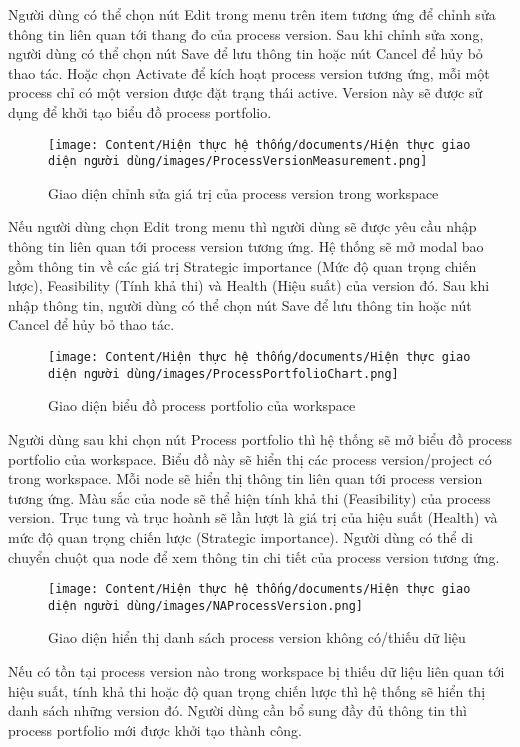 Người dùng có thể chọn nút Edit trong menu trên item tương ứng để chỉnh sửa thông tin liên quan tới thang đo của process version. Sau khi chỉnh sửa xong, người dùng có thể chọn nút Save để lưu thông tin hoặc nút Cancel để hủy bỏ thao tác. Hoặc chọn Activate để kích hoạt process version tương ứng, mỗi một process chỉ có một version được đặt trạng thái active. Version này sẽ được sử dụng để khởi tạo biểu đồ process portfolio.

\begin{figure}[H]
    \centering
    \texttt{[image: Content/Hiện thực hệ thống/documents/Hiện thực giao diện người dùng/images/ProcessVersionMeasurement.png]}
    \vspace{0.5cm}
    \caption{Giao diện chỉnh sửa giá trị của process version trong workspace}
    \label{fig: Giao diện chỉnh sửa giá trị của process version trong workspace}
\end{figure}

Nếu người dùng chọn Edit trong menu thì người dùng sẽ được yêu cầu nhập thông tin liên quan tới process version tương ứng. Hệ thống sẽ mở modal bao gồm thông tin về các giá trị Strategic importance (Mức độ quan trọng chiến lược), Feasibility (Tính khả thi) và Health (Hiệu suất) của version đó. Sau khi nhập thông tin, người dùng có thể chọn nút Save để lưu thông tin hoặc nút Cancel để hủy bỏ thao tác.

\begin{figure}[H]
    \centering
    \texttt{[image: Content/Hiện thực hệ thống/documents/Hiện thực giao diện người dùng/images/ProcessPortfolioChart.png]}
    \vspace{0.5cm}
    \caption{Giao diện biểu đồ process portfolio của workspace}
    \label{fig: Giao diện biểu đồ process portfolio của workspace}
\end{figure}

Người dùng sau khi chọn nút Process portfolio thì hệ thống sẽ mở biểu đồ process portfolio của workspace. Biểu đồ này sẽ hiển thị các process version/project có trong workspace. Mỗi node sẽ hiển thị thông tin liên quan tới process version tương ứng. Màu sắc của node sẽ thể hiện tính khả thi (Feasibility) của process version. Trục tung và trục hoành sẽ lần lượt là giá trị của hiệu suất (Health) và mức độ quan trọng chiến lược (Strategic importance). Người dùng có thể di chuyển chuột qua node để xem thông tin chi tiết của process version tương ứng.

\begin{figure}[H]
    \centering
    \texttt{[image: Content/Hiện thực hệ thống/documents/Hiện thực giao diện người dùng/images/NAProcessVersion.png]}
    \vspace{0.5cm}
    \caption{Giao diện hiển thị danh sách process version không có/thiếu dữ liệu}
    \label{fig: Giao diện hiển thị danh sách process version không có/thiếu dữ liệu}
\end{figure}

Nếu có tồn tại process version nào trong workspace bị thiếu dữ liệu liên quan tới hiệu suất, tính khả thi hoặc độ quan trọng chiến lược thì hệ thống sẽ hiển thị danh sách những version đó. Người dùng cần bổ sung đầy đủ thông tin thì process portfolio mới được khởi tạo thành công.